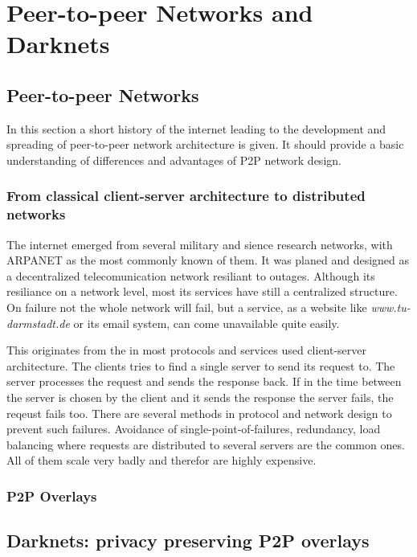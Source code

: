 \chapter{Peer-to-peer Networks and Darknets}


\section{Peer-to-peer Networks}
In this section a short history of the internet leading to the development and spreading of peer-to-peer network architecture is given. It should provide a basic understanding of differences and advantages of P2P network design.

\subsection{From classical client-server architecture to distributed networks}
The internet emerged from several military and sience research networks, with ARPANET as the most commonly known of them. It was planed and designed as a decentralized telecomunication network resiliant to outages. Although its resiliance on a network level, most its services have still a centralized structure. On failure not the whole network will fail, but a service, as a website like \emph{www.tu-darmstadt.de} or its email system, can come unavailable quite easily.

This originates from the in most protocols and services used client-server architecture. The clients tries to find a single server to send its request to. The server processes the request and sends the response back. If in the time between the server is chosen by the client and it sends the response the server fails, the reqeust fails too. There are several methods in protocol and network design to prevent such failures. Avoidance of single-point-of-failures, redundancy, load balancing where requests are distributed to several servers are the common ones. All of them scale very badly and therefor are highly expensive.


\subsection{P2P Overlays}



\section{Darknets: privacy preserving P2P overlays}



